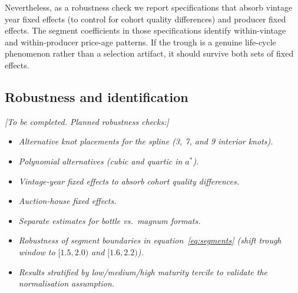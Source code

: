 Nevertheless, as a robustness check we report specifications that absorb vintage year fixed
effects (to control for cohort quality differences) and producer fixed effects. The segment
coefficients in those specifications identify within-vintage and within-producer price-age
patterns. If the trough is a genuine life-cycle phenomenon rather than a selection artifact,
it should survive both sets of fixed effects.

\subsection{Robustness and identification}
\label{sec:empirics:robust}

\noindent\textit{[To be completed. Planned robustness checks:]}
\begin{itemize}
  \item \textit{Alternative knot placements for the spline (3, 7, and 9 interior knots).}
  \item \textit{Polynomial alternatives (cubic and quartic in $a^*$).}
  \item \textit{Vintage-year fixed effects to absorb cohort quality differences.}
  \item \textit{Auction-house fixed effects.}
  \item \textit{Separate estimates for bottle vs.\ magnum formats.}
  \item \textit{Robustness of segment boundaries in equation~\eqref{eq:segments}
        (shift trough window to $[1.5, 2.0)$ and $[1.6, 2.2)$).}
  \item \textit{Results stratified by low/medium/high maturity tercile to validate
        the normalisation assumption.}
\end{itemize}
